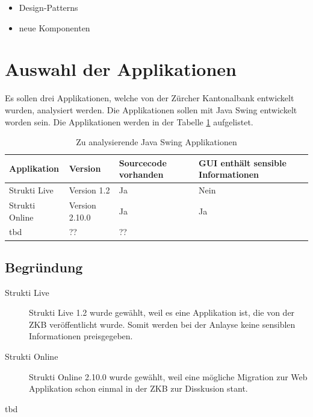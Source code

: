    \begin{itemize}
    \item Design-Patterns
    \item neue Komponenten
  \end{itemize}
  
  \section{Auswahl der Applikationen}
  
  Es sollen drei Applikationen, welche von der Zürcher Kantonalbank entwickelt
  wurden, analysiert werden. Die Applikationen sollen mit Java Swing entwickelt
  worden sein. Die Applikationen werden in der Tabelle
  \ref{tab:zuAnalysierendeJavaSwingApplikationen} aufgelistet.
  \newline
  
  \begin{table}[ht]
    \begin{center}
      \begin{tabular}{llp{2cm}p{3.5cm}}
        \toprule
        Applikation & Version & Sourcecode vorhanden & GUI enthält sensible
        Informationen\\
        \midrule
        Strukti Live & Version 1.2 & Ja & Nein\\
        Strukti Online & Version 2.10.0 & Ja & Ja\\
        tbd & ?? & ??\\
        \bottomrule
      \end{tabular}
      \caption{Zu analysierende Java Swing Applikationen}
      \label{tab:zuAnalysierendeJavaSwingApplikationen}
    \end{center}
  \end{table}
  
  \subsection{Begründung}
  
  \begin{description}
  \item[Strukti Live]
  Strukti Live 1.2 wurde gewählt, weil es eine Applikation ist, die
  von der ZKB veröffentlicht wurde. Somit werden bei der Anlayse keine
  sensiblen Informationen preisgegeben.
  \item[Strukti Online]
  Strukti Online 2.10.0 wurde gewählt, weil eine mögliche Migration
  zur Web Applikation schon einmal in der \ac{ZKB} zur Disskusion stant.
  \item[tbd]
  \end{description}
  
